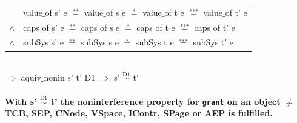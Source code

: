\documentclass[11pt,a4paper,twoside]{article}
\begin{document}
{\begin{tabular}{ll}
& value$\_$of s' e $\overset{\text{**}}{=}$ value$\_$of s e $\overset{\text{*}}{=}$ value$\_$of t e $\overset{\text{***}}{=}$ value$\_$of t' e \\
$\wedge$ & caps$\_$of s' e $\overset{\text{**}}{=}$ caps$\_$of s e $\overset{\text{*}}{=}$ caps$\_$of t e $\overset{\text{***}}{=}$ caps$\_$of t' e \\
$\wedge$ & subSys s' e $\overset{\text{**}}{=}$ subSys s e $\overset{\text{*}}{=}$ subSys t e $\overset{\text{***}}{=}$ subSys t' e
\end{tabular} \\
$\Rightarrow$ aquiv$\_$nonin s' t' D1 $\Rightarrow$ s' $\overset{\text{D1}}{\sim}$ t' \\ \\
\textbf{With s' $\overset{\text{D1}}{\sim}$ t' the noninterference property for \texttt{grant} on an object $\neq$ TCB, SEP, CNode, VSpace, IContr, SPage or AEP is fulfilled.} 
\clearpage
}
\end{document}
